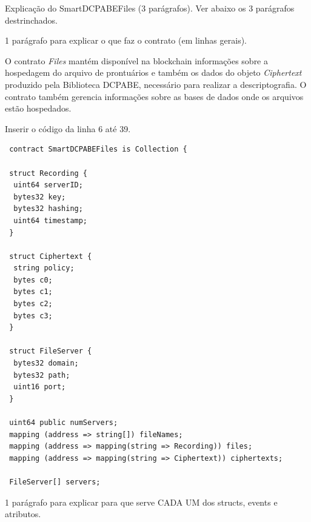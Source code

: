\documentclass[a4paper,11pt]{article}
\begin{document}
{\color{ForestGreen} Explicação do  SmartDCPABEFiles  (3 parágrafos). Ver abaixo os 3 parágrafos destrinchados.}

{\color{Magenta} 1 parágrafo para explicar o que faz o contrato (em linhas gerais).}

O contrato \emph{Files} mantém disponível na blockchain informações sobre a hospedagem do arquivo de prontuários e também os dados do objeto \emph{Ciphertext} produzido pela Biblioteca DCPABE, necessário para realizar a descriptografia. O contrato também gerencia informações sobre as bases de dados onde os arquivos estão hospedados.

{\color{Magenta} Inserir o código da linha 6 até 39.}

\begin{lstlisting}
 contract SmartDCPABEFiles is Collection {

 struct Recording {
  uint64 serverID;
  bytes32 key;
  bytes32 hashing;
  uint64 timestamp;
 }

 struct Ciphertext {
  string policy;
  bytes c0;
  bytes c1;
  bytes c2;
  bytes c3;
 }

 struct FileServer {
  bytes32 domain;
  bytes32 path;
  uint16 port;
 }

 uint64 public numServers;
 mapping (address => string[]) fileNames;
 mapping (address => mapping(string => Recording)) files;
 mapping (address => mapping(string => Ciphertext)) ciphertexts;

 FileServer[] servers;
\end{lstlisting}

{\color{Magenta} 1 parágrafo para explicar para que serve CADA UM dos structs, events e atributos.}
\end{document}
